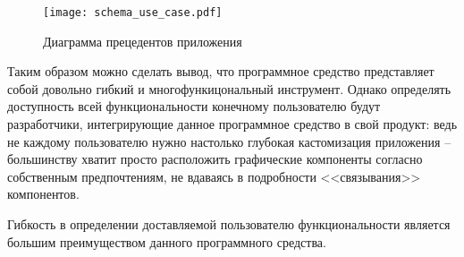 \begin{figure}
\centering
    \texttt{[image: schema\_use\_case.pdf]}
    \caption{Диаграмма прецедентов приложения}
    \label{sec:design:use_case}
\end{figure}

Таким образом можно сделать вывод, что программное средство представляет собой довольно гибкий и многофункицональный инструмент. Однако определять доступность всей функциональности конечному пользователю будут разработчики, интегрирующие данное программное средство в свой продукт: ведь не каждому пользователю нужно настолько глубокая кастомизация приложения -- большинству хватит просто расположить графические компоненты согласно собственным предпочтениям, не вдаваясь в подробности <<связывания>> компонентов.

Гибкость в определении доставляемой пользователю функциональности является большим преимуществом данного программного средства.

